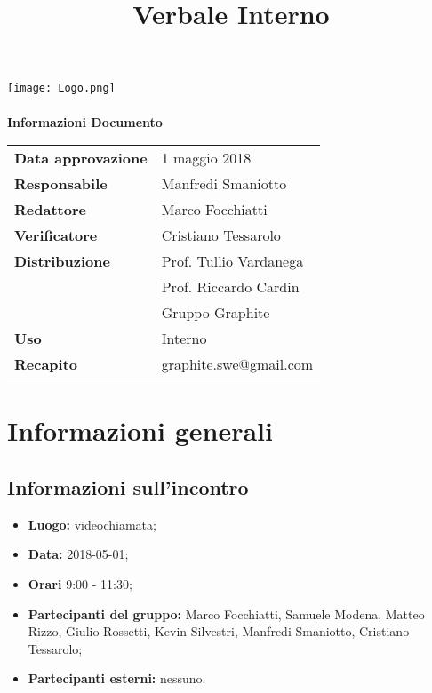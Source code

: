 \documentclass[openany,12pt,a4paper]{article}
\title{Verbale Interno}
\author{}
\begin{document}
	\makeatletter
	\begin{titlepage}
		\setlength{\headsep}{0pt}  
		\begin{center}
			\texttt{[image: Logo.png]}\\[1em]
			{\huge \bfseries  \@title }\\[10ex]
			\textbf{\Large Informazioni Documento} \\[2em]
			\bgroup
			\def\arraystretch{1.5}
			\begin{tabular}{l|l}
				\textbf{Data approvazione} & 1 maggio 2018 \\
				\textbf{Responsabile} & Manfredi Smaniotto \\
				\textbf{Redattore} & Marco Focchiatti \\
				\textbf{Verificatore} & Cristiano Tessarolo \\
				\textbf{Distribuzione} & Prof. Tullio Vardanega \\
				 & Prof. Riccardo Cardin \\
				 & Gruppo Graphite \\
				\textbf{Uso} & Interno \\
				\textbf{Recapito} & graphite.swe@gmail.com \\
			\end{tabular}
		\egroup
		\end{center}
	\end{titlepage}
	\makeatother

	\thispagestyle{empty}
	\newpage
	
	\tableofcontents
	\newpage
	
	\section{Informazioni generali}
	
	\subsection{Informazioni sull'incontro}
	
	\begin{itemize} 
	    \item \textbf{Luogo:} videochiamata;
	    \item \textbf{Data:} 2018-05-01;
	    \item \textbf{Orari} 9:00 - 11:30;
	    \item \textbf{Partecipanti del gruppo:} Marco Focchiatti, Samuele Modena, Matteo Rizzo, Giulio Rossetti, Kevin Silvestri, Manfredi Smaniotto, Cristiano Tessarolo;
	    \item \textbf{Partecipanti esterni:} nessuno.
	\end{itemize}
	
\end{document}
